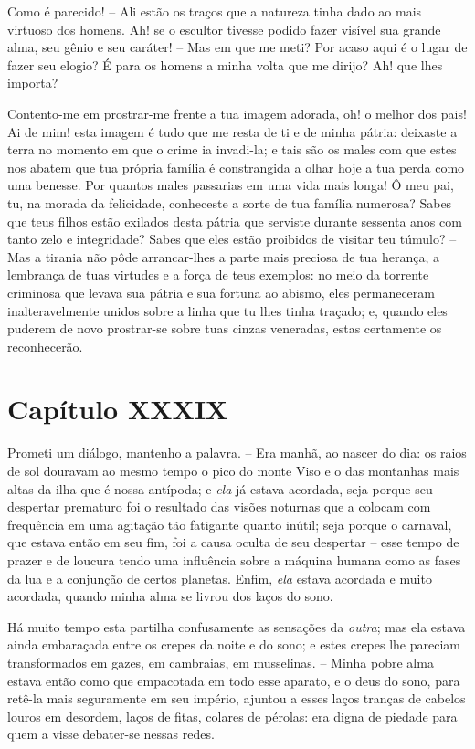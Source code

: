  Como é parecido! -- Ali estão os traços que a natureza tinha dado ao
mais virtuoso dos homens. Ah! se o escultor tivesse podido fazer
visível sua grande alma, seu gênio e seu caráter! -- Mas em que me
meti? Por acaso aqui é o lugar de fazer seu elogio? É para os homens a
minha volta que me dirijo? Ah! que lhes importa? 

 Contento-me em prostrar-me frente a tua imagem adorada, oh! o melhor
dos pais! Ai de mim! esta imagem é tudo que me resta de ti e de minha
pátria: deixaste a terra no momento em que o crime ia invadi-la; e tais
são os males com que estes nos abatem que tua própria família é
constrangida a olhar hoje a tua perda como uma benesse. Por quantos
males passarias em uma vida mais longa! Ô meu pai, tu, na morada
da felicidade, conheceste a sorte de tua família numerosa? Sabes que teus
filhos estão exilados desta pátria que serviste durante sessenta anos
com tanto zelo e integridade? Sabes que eles estão proibidos de visitar
teu túmulo? -- Mas a tirania não pôde arrancar-lhes a parte mais
preciosa de tua herança, a lembrança de tuas virtudes e a força de teus
exemplos: no meio da torrente criminosa que levava sua pátria e sua
fortuna ao abismo, eles permaneceram inalteravelmente unidos sobre a
linha que tu lhes tinha traçado; e, quando eles puderem de novo
prostrar-se sobre tuas cinzas veneradas, estas certamente os
reconhecerão. 

\section{Capítulo XXXIX}

 Prometi um diálogo, mantenho a palavra. -- Era manhã, ao nascer do
dia: os raios de sol douravam ao mesmo tempo o pico do monte Viso e o
das montanhas mais altas da ilha que é nossa antípoda; e \textit{ela}
já estava acordada, seja porque seu despertar prematuro foi o resultado
das visões noturnas que a colocam com frequência em uma agitação tão
fatigante quanto inútil; seja porque o carnaval, que estava então em
seu fim, foi a causa oculta de seu despertar -- esse tempo de prazer e
de loucura tendo uma influência sobre a máquina humana como as fases da
lua e a conjunção de certos planetas. Enfim, \textit{ela} estava
acordada e muito acordada, quando minha alma se livrou dos laços do
sono. 

 Há muito tempo esta partilha confusamente as sensações da
\textit{outra}; mas ela estava ainda embaraçada entre os crepes da
noite e do sono; e estes crepes lhe pareciam transformados em gazes, em
cambraias, em musselinas. -- Minha pobre alma estava então como que
empacotada em todo esse aparato, e o deus do sono, para retê-la mais
seguramente em seu império, ajuntou a esses laços tranças de cabelos
louros em desordem, laços de fitas, colares de pérolas: era digna de
piedade para quem a visse debater-se nessas redes. 

